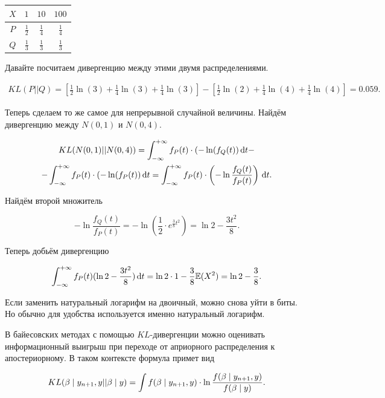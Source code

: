 \documentclass[12pt, a4paper, oneside]{article}
\begin{document}
\begin{center}
	\begin{tabular}{c|c|c|c}
		$X$ & $1$ & $10$  &  $100$  \\ \hline
		$P$ & $\frac{1}{2}$  & $\frac{1}{4}$   &  $\frac{1}{4}$  \\ \hline 
		$Q$  &  $\frac{1}{3}$  &  $\frac{1}{3}$  &  $\frac{1}{3}$ 
	\end{tabular}
\end{center}


Давайте посчитаем дивергенцию между этими двумя распределениями. 

\begin{multline*}
KL(P || Q) = \left[ \frac{1}{2} \ln(3) + \frac{1}{4} \ln(3) + \frac{1}{4} \ln(3) \right] - \left[ \frac{1}{2} \ln(2) + \frac{1}{4} \ln(4) + \frac{1}{4} \ln(4) \right] = 0.059.
\end{multline*}

Теперь сделаем то же самое для непрерывной случайной величины. Найдём дивергенцию между $N(0,1)$ и $N(0,4)$.

\begin{multline*}
KL(N(0,1) || N(0,4)) = \int_{-\infty}^{+\infty} f_P(t) \cdot (-\ln(f_Q(t)) \,\mathrm{d}t - \\ -\int_{-\infty}^{+\infty} f_P(t) \cdot (-\ln(f_P(t)) \,\mathrm{d}t = \int_{-\infty}^{+\infty} f_P(t) \cdot \left( -\ln \frac{f_Q(t)}{f_P(t)} \right) \,\mathrm{d}t. 
\end{multline*}

Найдём второй множитель

\[ - \ln \frac{f_Q(t)}{f_P(t)}  = -\ln \left(\frac{1}{2} \cdot e^{\tfrac{3}{8} t^2} \right) = \ln2 - \frac{3t^2}{8}.  \]

Теперь добьём дивергенцию 

\[ \int_{-\infty}^{+\infty} f_P(t) (\ln2 - \frac{3t^2}{8}) \,\mathrm{d}t = \ln2 \cdot 1 - \frac{3}{8} \mathbb{E}(X^2) = \ln2 - \frac{3}{8}. \]

Если заменить натуральный логарифм на двоичный, можно снова уйти в биты.  Но обычно для удобства используется именно натуральный логарифм.

 
 В байесовских методах с помощью $KL$-дивергенции можно оценивать информационный выигрыш при переходе от априорного распределения к апостериорному. В таком контексте формула примет вид 
 
 \[ KL(\beta \mid y_{n+1}, y || \beta \mid y) =  \int f(\beta \mid y_{n+1}, y) \cdot \ln \frac{f(\beta \mid y_{n+1}, y)}{f(\beta \mid y)}. \]
\end{document}
